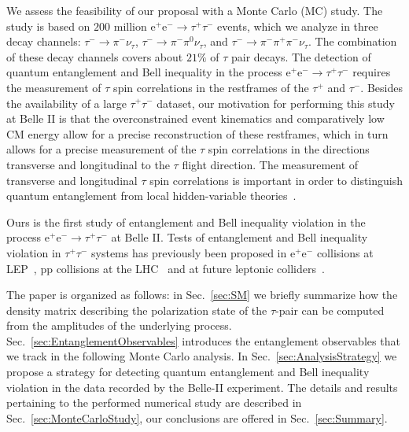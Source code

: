 \documentclass[a4paper,12pt,twocolumn]{article}
\numberwithin{equation}{section} %
\newcommand{\Pem}{\ensuremath{\textrm{e}^{-}}\xspace}
\newcommand{\Pep}{\ensuremath{\textrm{e}^{+}}\xspace}
\newcommand{\Pgngt}{\ensuremath{\nu_{\tau}}\xspace}
\newcommand{\Pgpm}{\ensuremath{\pi^{-}}\xspace}
\newcommand{\Pgpp}{\ensuremath{\pi^{+}}\xspace}
\newcommand{\Pgpz}{\ensuremath{\pi^{\textrm{0}}}\xspace}
\newcommand{\Pgt}{\ensuremath{\tau}\xspace}
\newcommand{\Pgtm}{\ensuremath{\tau^{-}}\xspace}
\newcommand{\Pgtp}{\ensuremath{\tau^{+}}\xspace}
\newcommand{\Pp}{\ensuremath{\textrm{p}}\xspace}
\begin{document}
We assess the feasibility of our proposal with a Monte Carlo (MC) study.
The study is based on $200$ million $\Pep\Pem \to \Pgtp\Pgtm$ events, which we analyze in three decay channels: $\Pgtm \to \Pgpm\Pgngt$, $\Pgtm \to \Pgpm\Pgpz\Pgngt$, and $\Pgtm \to \Pgpm\Pgpp\Pgpm\Pgngt$.
The combination of these decay channels covers about $21\%$ of $\Pgt$ pair decays. 
The detection of quantum entanglement and Bell inequality in the process $\Pep\Pem \to \Pgtp\Pgtm$ requires the measurement of $\Pgt$ spin correlations in the restframes of the $\Pgtp$ and $\Pgtm$.
Besides the availability of a large $\Pgtp\Pgtm$ dataset, our motivation for performing this study at Belle II is that the
overconstrained event kinematics and comparatively low CM energy allow for a precise reconstruction of these restframes,
which in turn allows for a precise measurement of the $\Pgt$ spin correlations in the directions transverse and longitudinal to the $\Pgt$ flight direction. The measurement of transverse and longitudinal $\Pgt$ spin correlations is important in order to distinguish quantum entanglement from local hidden-variable theories~\cite{Abel:1992kz}.

Ours is the first study of entanglement and Bell inequality violation in the process $\Pep\Pem \to \Pgtp\Pgtm$ at Belle II. Tests of entanglement and Bell inequality violation in $\Pgtp\Pgtm$ systems has previously been proposed in $\Pep\Pem$ collisions at LEP~\cite{Privitera:1991nz}, $\Pp\Pp$ collisions at the LHC~\cite{Fabbrichesi:2022ovb} and at future leptonic colliders~\cite{Altakach:2022ywa,Ma:2023yvd}.

The paper is organized as follows: in Sec.~\ref{sec:SM} we briefly summarize how the density matrix describing the polarization state of the $\tau$-pair can be computed from the amplitudes of the underlying process. Sec.~\ref{sec:EntanglementObservables} introduces the entanglement observables that we track in the following Monte Carlo analysis. In Sec.~\ref{sec:AnalysisStrategy} we propose a strategy for detecting quantum entanglement and Bell inequality violation in the data recorded by the Belle-II experiment. The details and results pertaining to the performed numerical study are described in Sec.~\ref{sec:MonteCarloStudy}, our conclusions are offered in Sec.~\ref{sec:Summary}.  
\end{document}
